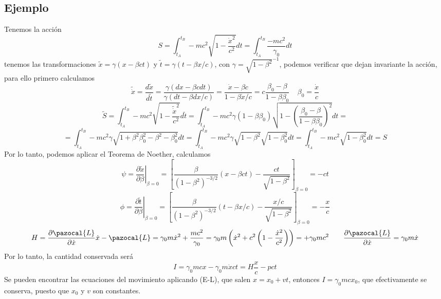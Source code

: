 \subsection{Ejemplo}
Tenemos la acción
\[S = \int_{t_A}^{t_B} -mc^2 \sqrt{1-\frac{\dot{x}^2}{c^2}}dt = \int_{t_A}^{t_B} \frac{-mc^2}{\gamma_0} dt\]
tenemos las transformaciones $\tilde{x} = \gamma(x-\beta c t)$ y $\tilde{t} = \gamma(t-\beta x/c)$, con $\gamma = \sqrt{1-\beta^2}^{-1}$, podemos verificar que dejan invariante la acción, para ello primero calculamos
\[\tilde{\dot{x}}=\frac{d\tilde{x}}{d\tilde{t}} = \frac{\gamma (dx - \beta c dt)}{\gamma(dt-\beta dx/c)} = \frac{\dot{x}-\beta c}{1-\beta \dot{x}/c} = c \frac{\beta_0-\beta}{1-\beta \beta_0} \ \ \ \ \ \beta_0 = \frac{\dot{x}}{c}\]
\[\tilde{S} = \int_{t_A}^{t_B} -mc^2 \sqrt{1-\frac{\tilde{\dot{x}}^2}{c^2}}d\tilde{t} = \int_{t_A}^{t_B} -mc^2 \gamma (1-\beta \beta_0)\sqrt{1-\left(\frac{\beta_0-\beta}{1-\beta \beta_0}\right)^2}  dt = \]
\[= \int_{t_A}^{t_B} -mc^2 \gamma \sqrt{1 + \beta^2 \beta_0^2 -\beta^2-\beta_0^2} dt= \int_{t_A}^{t_B} -mc^2 \gamma \sqrt{1-\beta^2}\sqrt{1-\beta_0^2}dt = \int_{t_A}^{t_B} -mc^2 \sqrt{1-\beta_0^2}dt = S\]
Por lo tanto, podemos aplicar el Teorema de Noether, calculamos 
\[\psi = \left.\frac{\partial \tilde{x}}{\partial \beta}\right|_{\beta = 0} = \left[\frac{\beta}{(1-\beta^2)^{-3/2}}(x-\beta c t) - \frac{ct}{\sqrt{1-\beta^2}} \right]_{\beta = 0} = -ct\]
\[\phi = \left.\frac{\partial \tilde{t}}{\partial \beta}\right|_{\beta = 0} = \left[\frac{\beta}{(1-\beta^2)^{-3/2}}(t-\beta x/c) - \frac{x/c}{\sqrt{1-\beta^2}} \right]_{\beta = 0} = -\frac{x}{c}\]
\[H = \frac{\partial \pazocal{L}}{\partial \dot{x}} \dot{x} - \pazocal{L} = \gamma_0 m \dot{x}^2+\frac{mc^2}{\gamma_0} = \gamma_0 m \left(\dot{x}^2+c^2\left(1-\frac{\dot{x}^2}{c^2}\right)\right) = +\gamma_0 m c^2 \ \ \ \ \ \ \frac{\partial \pazocal{L}}{\partial \dot{x}} = \gamma_0 m \dot{x}\]
Por lo tanto, la cantidad conservada será
\[I =\gamma_0 m c x- \gamma_0 m \dot{x} ct = H \frac{x}{c} - pct\]
Se pueden encontrar las ecuaciones del movimiento aplicando (E-L), que salen $x = x_0 + vt$, entonces $I = \gamma_0 m c x_0$, que efectivamente se conserva, puesto que $x_0$ y $v$ son constantes.

\newpage\null\thispagestyle{empty}\newpage
